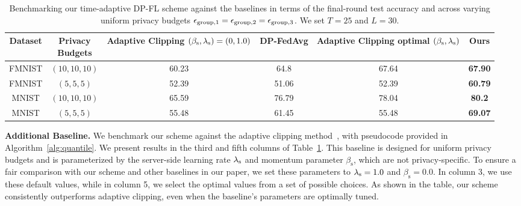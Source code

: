 {\begin{table}[h!]
\centering
\caption{
{Benchmarking our time-adaptive DP-FL scheme against the baselines in terms of the final-round test accuracy and across varying uniform privacy budgets ${\epsilon}_{\text{group},1}= {\epsilon}_{\text{group},2}= {\epsilon}_{\text{group},3}$. We set $T=25$ and $L=30$.}}
\small 
\setlength{\tabcolsep}{10pt} 
\renewcommand{\arraystretch}{1.2} 
\begin{tabular}{cccccc}
\toprule
\textbf{Dataset} & \makecell[tl]{\textbf{Privacy} \\ {Budgets}} & \makecell[tl]{\textbf{Adaptive Clipping} \\ $(\beta_{\text{s}},\lambda_{\text{s}})=(0, 1.0)$} & \textbf{DP-FedAvg} & \makecell[tl]{\textbf{Adaptive Clipping} \\ optimal $(\beta_{\text{s}},\lambda_{\text{s}})$} & \textbf{Ours} \\ 
\midrule
FMNIST & $(10,10, 10)$ & 60.23 & 64.8 & 67.64 & \textbf{67.90} \\  
FMNIST & $(5,5, 5)$ & 52.39 & 51.06 & 52.39 & \textbf{60.79} \\  
\hline
MNIST & $(10, 10, 10)$ & 65.59 & 76.79 & 78.04 & \textbf{80.2} \\  
MNIST & $(5, 5, 5)$ & 55.48 & 61.45 & 55.48 & \textbf{69.07} \\  
\bottomrule
\end{tabular}
\label{tab:strictprivacybudgetstable2}
\vspace{-2ex}
\end{table}

\textbf{Additional Baseline.} 
{We benchmark our scheme against the adaptive clipping method~\cite{andrew2021differentially}, with pseudocode provided in Algorithm~\ref{alg:quantile}. We present results in the third and fifth columns of Table~\ref{tab:strictprivacybudgetstable2}. This baseline is designed for uniform privacy budgets and is parameterized by the server-side learning rate $\lambda_{\text{s}}$ and momentum parameter $\beta_{\text{s}}$, which are not privacy-specific. To ensure a fair comparison with our scheme and other baselines in our paper, we set these parameters to $\lambda_{\text{s}}=1.0$ and $\beta_{\text{s}}=0.0$. In column 3, we use these default values, while in column 5, we select the optimal values from a set of possible choices. As shown in the table, our scheme consistently outperforms adaptive clipping, even when the baseline’s parameters are optimally tuned. 
}






}
